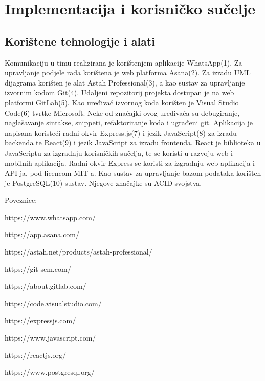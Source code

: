 \chapter{Implementacija i korisničko sučelje}
		
		
		\section{Korištene tehnologije i alati}
		
			Komunikaciju u timu realizirana je korištenjem aplikacije WhatsApp(1). Za upravljanje podjele rada korištena je web platforma Asana(2). Za izradu UML dijagrama korišten je alat Astah Professional(3), a kao sustav za upravljanje izvornim kodom Git(4). Udaljeni repozitorij projekta dostupan je na web platformi GitLab(5). 
			Kao uređivač izvornog koda korišten je Visual Studio Code(6) tvrtke Microsoft. Neke od značajki ovog uređivača su debugiranje, naglašavanje sintakse, snippeti, refaktoriranje koda i ugrađeni git.
			Aplikacija je napisana koristeći radni okvir Express.js(7) i jezik JavaScript(8) za izradu backenda te React(9) i jezik JavaScript za izradu frontenda. React je biblioteka u JavaScriptu za izgradnju korisničkih sučelja, te se koristi u razvoju web i mobilnih aplikacija. Radni okvir Express se koristi za izgradnju web aplikacija i API-ja, pod licencom MIT-a.
			Kao sustav za upravljanje bazom podataka korišten je PostgreSQL(10) sustav. Njegove značajke su ACID svojstva. 
			
			Poveznice:
			\begin{packed_enum}	
				\item https://www.whatsapp.com/
				\item https://app.asana.com/
				\item https://astah.net/products/astah-professional/
				\item https://git-scm.com/
				\item https://about.gitlab.com/
				\item https://code.visualstudio.com/
				\item https://expressjs.com/
				\item https://www.javascript.com/
				\item https://reactjs.org/
				\item https://www.postgresql.org/
				
				
			\end{packed_enum}
			
			
			\eject 
		
